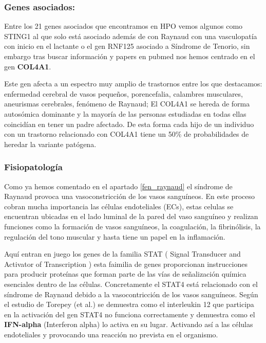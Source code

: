 \subsubsection{Genes asociados:}
\label{genes_asociados}
Entre los 21 genes asociados que encontramos en HPO vemos algunos como STING1 al que solo está asociado además de con Raynaud con una vasculopatía con inicio en el lactante o el gen RNF125 asociado a Síndrome de Tenorio, sin embargo tras buscar información y papers en pubmed nos hemos centrado en el gen \textbf{COL4A1}. \cite{Plaisier1993COL4A1-RelatedDisorders}

Este gen afecta a un espectro muy amplio de trastornos entre los que destacamos: enfermedad cerebral de vasos pequeños, porencefalia, calambres musculares, aneurismas cerebrales, fenómeno de Raynaud; El COL4A1 se hereda de forma autosómica dominante y la mayoría de las personas estudiadas en todas ellas coincidían en tener un padre afectado. De esta forma cada hijo de un individuo con un trastorno relacionado con COL4A1 tiene un 50\% de probabilidades de heredar la variante patógena.

\subsubsection{Fisiopatología}

Como ya hemos comentado en el apartado \ref{fen_raynaud} el síndrome de Raynaud provoca una vasoconstricción de los vasos sanguíneos. En este proceso cobran mucha importancia las células endoteliales (ECs), estas celulas se encuentran ubicadas en el lado luminal de la pared del vaso sanguíneo y realizan funciones como la formación de vasos sanguíneos, la coagulación, la fibrinólisis, la regulación del tono muscular y hasta tiene un papel en la inflamación. 

Aquí entran en juego los genes de la familia STAT ( Signal Transducer and Activator of Transcription ) esta faimilia de genes proporcionan instrucciones para producir proteínas que forman parte de las vías de señalización química esenciales dentro de las células. Concretamente el STAT4 está relacionado con el síndrome de Raynaud debido a la vasocontricción de los vasos sanguíneos. Según el estudio de Torepey (et al.)\cite{Torpey2004InterferonCells} se demuestra como el interleukin 12 que participa en la activación del gen STAT4 no funciona correctamente y demuestra como el \textbf{IFN-alpha} (Interferon alpha) lo activa en su lugar. Activando así a las células endoteliales y provocando una reacción no prevista en el organismo.

